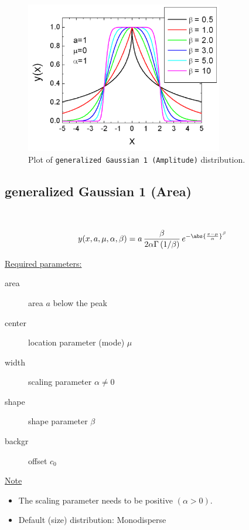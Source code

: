 \begin{figure}[htb]
\begin{center}
\includegraphics[width=0.768\textwidth]{generalizedGaussian1Amplitude.png}
\end{center}
\caption{Plot of \texttt{generalized Gaussian 1 (Amplitude)}
distribution.} \label{fig:generalizedGaussian1Amplitude}
\end{figure}

\clearpage
\subsection{generalized Gaussian 1 (Area)} ~\\
\label{sec:generalizedGaussian1Area}

\begin{align}
y(x,a,\mu,\alpha,\beta) = a\,
\frac{\beta}{2\alpha\Gamma\left(1/\beta\right)} \,
e^{-\abs{\frac{x-\mu}{\alpha}}^\beta}
\end{align}

\uline{Required parameters:}
\begin{description}
    \item[area] area $a$ below the peak
    \item[center] location parameter (mode) $\mu$
    \item[width] scaling parameter $\alpha \neq 0$
    \item[shape] shape parameter $\beta$
    \item[backgr] offset $c_0$
\end{description}

\uline{Note}
\begin{itemize}
  \item The scaling parameter needs to be positive $(\alpha > 0)$.
  \item Default (size) distribution: Monodisperse
\end{itemize}

